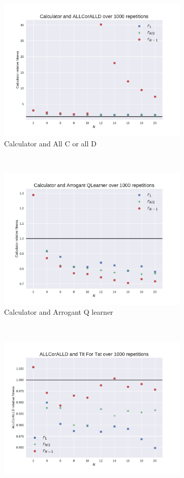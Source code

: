 \documentclass{article}
\begin{document}
\begin{figure}[!hbtp]
    \begin{subfigure}[t]{.3\textwidth}
        \centering
        \includegraphics[width=.8\textwidth]{./img/Calculator_v_ALLCorALLD_fitness.pdf}
        \caption{Calculator and All C or all D}
    \end{subfigure}%
    ~
    \begin{subfigure}[t]{.3\textwidth}
        \centering
        \includegraphics[width=.8\textwidth]{./img/Calculator_v_Arrogant_QLearner_fitness.pdf}
        \caption{Calculator and Arrogant Q learner}
    \end{subfigure}%
    ~
    \begin{subfigure}[t]{.3\textwidth}
        \centering
        \includegraphics[width=.8\textwidth]{./img/ALLCorALLD_v_Tit_For_Tat_fitness.pdf}

\end{subfigure}
\end{figure}
\end{document}
